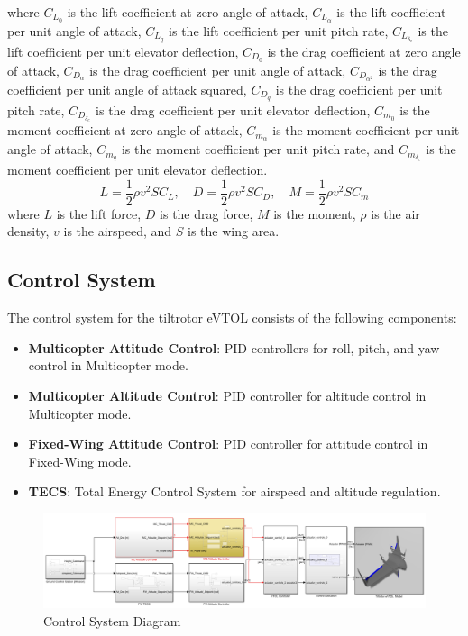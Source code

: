 \documentclass[journal,article,submit,pdftex,moreauthors]{Definitions/mdpi}
\begin{document}
where \(C_{L_0}\) is the lift coefficient at zero angle of attack, \(C_{L_\alpha}\) is the lift coefficient per unit angle of attack, \(C_{L_q}\) is the lift coefficient per unit pitch rate, \(C_{L_{\delta_e}}\) is the lift coefficient per unit elevator deflection, \(C_{D_0}\) is the drag coefficient at zero angle of attack, \(C_{D_\alpha}\) is the drag coefficient per unit angle of attack, \(C_{D_{\alpha^2}}\) is the drag coefficient per unit angle of attack squared, \(C_{D_q}\) is the drag coefficient per unit pitch rate, \(C_{D_{\delta_e}}\) is the drag coefficient per unit elevator deflection, \(C_{m_0}\) is the moment coefficient at zero angle of attack, \(C_{m_\alpha}\) is the moment coefficient per unit angle of attack, \(C_{m_q}\) is the moment coefficient per unit pitch rate, and \(C_{m_{\delta_e}}\) is the moment coefficient per unit elevator deflection.
\begin{equation}
    L = \frac{1}{2} \rho v^2 S C_L, \quad D = \frac{1}{2} \rho v^2 S C_D, \quad M = \frac{1}{2} \rho v^2 S C_m
\end{equation}
where \(L\) is the lift force, \(D\) is the drag force, \(M\) is the moment, \(\rho\) is the air density, \(v\) is the airspeed, and \(S\) is the wing area.


\subsection{Control System}
The control system for the tiltrotor eVTOL consists of the following components:
\begin{itemize}
    \item \textbf{Multicopter Attitude Control}: PID controllers for roll, pitch, and yaw control in Multicopter mode.
    \item \textbf{Multicopter Altitude Control}: PID controller for altitude control in Multicopter mode.
    \item \textbf{Fixed-Wing Attitude Control}: PID controller for attitude control in Fixed-Wing mode.
    \item \textbf{TECS}: Total Energy Control System for airspeed and altitude regulation.
\end{itemize}

\begin{figure}[H]
    \centering
    \includegraphics[width=0.8\linewidth]{control_system_diagram.png}
    \caption{Control System Diagram}
    \label{fig:control_system_diagram}
\end{figure}
\end{document}
